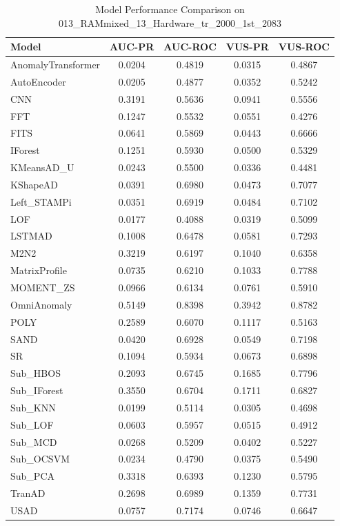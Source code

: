 \documentclass[12pt,oneside]{article}
\begin{document}
\begin{table}[htbp]
    \centering
    \caption{Model Performance Comparison on 013\_RAMmixed\_13\_Hardware\_tr\_2000\_1st\_2083}
    \begin{tabular}{|l|c|c|c|c|}
        \toprule
        \textbf{Model} & \textbf{AUC-PR} & \textbf{AUC-ROC} & \textbf{VUS-PR} & \textbf{VUS-ROC} \\
        \midrule
        AnomalyTransformer & 0.0204 & 0.4819 & 0.0315 & 0.4867 \\
        AutoEncoder & 0.0205 & 0.4877 & 0.0352 & 0.5242 \\
        CNN & 0.3191 & 0.5636 & 0.0941 & 0.5556 \\
        FFT & 0.1247 & 0.5532 & 0.0551 & 0.4276 \\
        FITS & 0.0641 & 0.5869 & 0.0443 & 0.6666 \\
        IForest & 0.1251 & 0.5930 & 0.0500 & 0.5329 \\
        KMeansAD\_U & 0.0243 & 0.5500 & 0.0336 & 0.4481 \\
        KShapeAD & 0.0391 & 0.6980 & 0.0473 & 0.7077 \\
        Left\_STAMPi & 0.0351 & 0.6919 & 0.0484 & 0.7102 \\
        LOF & 0.0177 & 0.4088 & 0.0319 & 0.5099 \\
        LSTMAD & 0.1008 & 0.6478 & 0.0581 & 0.7293 \\
        M2N2 & 0.3219 & 0.6197 & 0.1040 & 0.6358 \\
        MatrixProfile & 0.0735 & 0.6210 & 0.1033 & 0.7788 \\
        MOMENT\_ZS & 0.0966 & 0.6134 & 0.0761 & 0.5910 \\
        OmniAnomaly & 0.5149 & 0.8398 & 0.3942 & 0.8782 \\
        POLY & 0.2589 & 0.6070 & 0.1117 & 0.5163 \\
        SAND & 0.0420 & 0.6928 & 0.0549 & 0.7198 \\
        SR & 0.1094 & 0.5934 & 0.0673 & 0.6898 \\
        Sub\_HBOS & 0.2093 & 0.6745 & 0.1685 & 0.7796 \\
        Sub\_IForest & 0.3550 & 0.6704 & 0.1711 & 0.6827 \\
        Sub\_KNN & 0.0199 & 0.5114 & 0.0305 & 0.4698 \\
        Sub\_LOF & 0.0603 & 0.5957 & 0.0515 & 0.4912 \\
        Sub\_MCD & 0.0268 & 0.5209 & 0.0402 & 0.5227 \\
        Sub\_OCSVM & 0.0234 & 0.4790 & 0.0375 & 0.5490 \\
        Sub\_PCA & 0.3318 & 0.6393 & 0.1230 & 0.5795 \\
        TranAD & 0.2698 & 0.6989 & 0.1359 & 0.7731 \\
        USAD & 0.0757 & 0.7174 & 0.0746 & 0.6647 \\
        \bottomrule
    \end{tabular}
    
    \label{tab:model_performance_RAMmixed}
\end{table}


\end{document}
